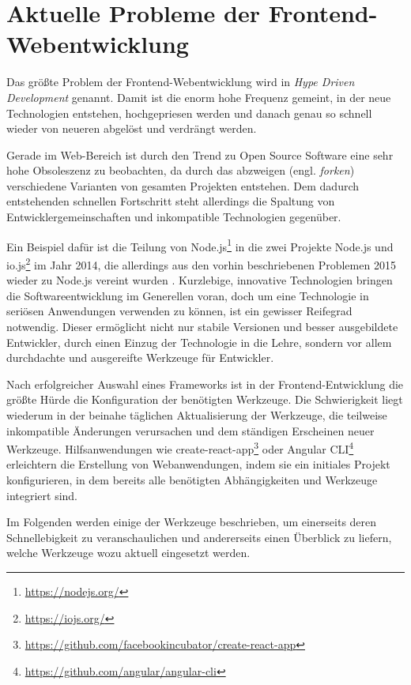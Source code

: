 \chapter{Aktuelle Probleme der Frontend-Webentwicklung}
\label{cha:frontend-problems}

Das größte Problem der Frontend-Webentwicklung wird in \autocite{Kirejczyk.HDD:online} \emph{Hype Driven Development} genannt.
Damit ist die enorm hohe Frequenz gemeint, in der neue Technologien entstehen, hochgepriesen werden und danach genau so schnell wieder von neueren abgelöst und verdrängt werden.

Gerade im Web-Bereich ist durch den Trend zu Open Source Software eine sehr hohe Obsoleszenz zu beobachten, da durch das abzweigen (engl. \emph{forken}) verschiedene Varianten von gesamten Projekten entstehen.
Dem dadurch entstehenden schnellen Fortschritt steht allerdings die Spaltung von Entwicklergemeinschaften und inkompatible Technologien gegenüber.

Ein Beispiel dafür ist die Teilung von Node.js\footnote{\url{https://nodejs.org/}} in die zwei Projekte Node.js und io.js\footnote{\url{https://iojs.org/}} im Jahr 2014, die allerdings aus den vorhin beschriebenen Problemen 2015 wieder zu Node.js vereint wurden \autocite{Node.io-node-merge:online}.
Kurzlebige, innovative Technologien bringen die Softwareentwicklung im Generellen voran, doch um eine Technologie in seriösen Anwendungen verwenden zu können, ist ein gewisser Reifegrad notwendig.
Dieser ermöglicht nicht nur stabile Versionen und besser ausgebildete Entwickler, durch einen Einzug der Technologie in die Lehre, sondern vor allem durchdachte und ausgereifte Werkzeuge für Entwickler.

Nach erfolgreicher Auswahl eines Frameworks ist in der Frontend-Entwicklung die größte Hürde die Konfiguration der benötigten Werkzeuge.
Die Schwierigkeit liegt wiederum in der beinahe täglichen Aktualisierung der Werkzeuge, die teilweise inkompatible Änderungen verursachen und dem ständigen Erscheinen neuer Werkzeuge.
Hilfsanwendungen wie create-react-app\footnote{\url{https://github.com/facebookincubator/create-react-app}} oder Angular CLI\footnote{\url{https://github.com/angular/angular-cli}} erleichtern die Erstellung von Webanwendungen, indem sie ein initiales Projekt konfigurieren, in dem bereits alle benötigten Abhängigkeiten und Werkzeuge integriert sind.

Im Folgenden werden einige der Werkzeuge beschrieben, um einerseits deren Schnellebigkeit zu veranschaulichen und andererseits einen Überblick zu liefern, welche Werkzeuge wozu aktuell eingesetzt werden.

